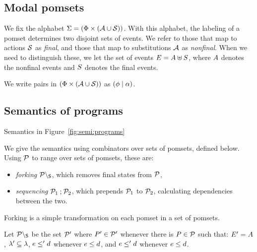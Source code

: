 \subsection{Modal pomsets}
\label{sec:semi:pomsets}

We fix the alphabet $\Sigma=(\Phi\times(\mathcal{A}\cup\mathcal{S}))$.  With this
alphabet, the labeling of a pomset determines two disjoint sets of events.
We refer to those that map to actions $\mathcal{S}$ as \emph{final}, and those that
map to substitutions $\mathcal{A}$ as \emph{nonfinal}.
When we need to distinguish these, we let the set of events
$E=A\uplus S$, where $A$ denotes the nonfinal events 
and $S$ denotes the final events.

We write pairs in $(\Phi\times(\mathcal{A}\cup\mathcal{S}))$ as $(\phi \mid \alpha)$.
\subsection{Semantics of programs}
\label{sec:semi:semantics}

Semantics in Figure~\ref{fig:semi:programs}

We give the semantics using combinators over sets of pomsets, defined below.
Using $\mathcal{P}$ to range over sets of pomsets, these are:
\begin{itemize}
\item \emph{forking} $\mathcal{P}\setminus_{\mathsf{S}}$, which removes final states from
  $\mathcal{P}$, 
\item \emph{sequencing} $\mathcal{P}_1\mathbin;\mathcal{P}_2$, which prepends
  $\mathcal{P}_1$ to $\mathcal{P}_2$, calculating dependencies between the two.
\end{itemize}

Forking is %
a simple transformation on each pomset
in a set of pomsets.

\begin{definition}
Let $\mathcal{P}\setminus_{\mathsf{S}}$ be the set $\mathcal{P}'$ where $P'\in\mathcal{P}'$ whenever
there is $P\in\mathcal{P}$ such that:
$E' = A$,
$\lambda'\subseteq\lambda$,
$e\le'd$ whenever $e\le d$, and
$e\leq'd$ whenever $e\leq d$.
\end{definition}

